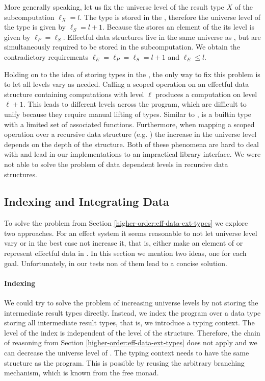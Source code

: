 More generally speaking, let us fix the universe level of the result type $X$ of
the subcomputation $\ell_X = l$.
The type is stored in the , therefore the universe level of the
 type is given by $\ell_S = l + 1$.
Because the  stores an element of the  its
level is given by $\ell_P = \ell_S$.
Effectful data structures live in the same universe as , but
are simultaneously required to be stored in the subcomputation.
We obtain the contradictory requirements $\ell_E = \ell_P = \ell_S = l + 1$ and
$\ell_E  \leqslant l$.

Holding on to the idea of storing types in the , the only way to
fix this problem is to let all levels vary as needed.
Calling a scoped operation on an effectful data structure containing
computations with level $\ell$ produces a computation on level $\ell + 1$.
This leads to different levels across the program, which are difficult to unify
because they require manual lifting of types.
Similar to ,  is a builtin type with a
limited set of associated functions.
Furthermore, when mapping a scoped operation over a recursive data structure
(e.g. ) the increase in the universe level depends on the
depth of the structure.
Both of these phenomena are hard to deal with and lead in our implementations to
an impractical library interface.
We were not able to solve the problem of data dependent levels in recursive data
structures.


\subsection{Indexing and Integrating Data}
\label{higher-order:fixes}

To solve the problem from Section \ref{higher-order:eff-data-ext-types} we
explore two approaches.
For an effect system it seems reasonable to not let universe level vary or in
the best case not increase it, that is, either make  an
element of  or represent effectful data in .
In this section we mention two ideas, one for each goal.
Unfortunately, in our tests non of them lead to a concise solution.

\paragraph{Indexing}
We could try to solve the problem of increasing universe levels by not storing
the intermediate result types directly.
Instead, we index the program over a data type storing all intermediate result
types, that is, we introduce a typing context.
The level of the index is independent of the level of the structure.
Therefore, the chain of reasoning from Section
\ref{higher-order:eff-data-ext-types} does not apply and we can decrease the
universe level of .
The typing context needs to have the same structure as the program.
This is possible by reusing the arbitrary branching mechanism, which is known
from the free monad.

